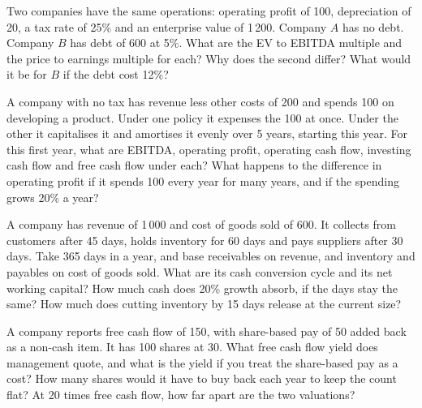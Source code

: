 \begin{question}\label{iq:iv2:valuation-and-financial-statements:13}
Two companies have the same operations: operating profit of 100, depreciation of 20, a tax rate of 25\% and an enterprise value of 1\,200. Company $A$ has no debt. Company $B$ has debt of 600 at 5\%. What are the EV to EBITDA multiple and the price to earnings multiple for each? Why does the second differ? What would it be for $B$ if the debt cost 12\%?
\end{question}

\begin{question}\label{iq:iv2:valuation-and-financial-statements:14}
A company with no tax has revenue less other costs of 200 and spends 100 on developing a product. Under one policy it expenses the 100 at once. Under the other it capitalises it and amortises it evenly over 5 years, starting this year. For this first year, what are EBITDA, operating profit, operating cash flow, investing cash flow and free cash flow under each? What happens to the difference in operating profit if it spends 100 every year for many years, and if the spending grows 20\% a year?
\end{question}

\begin{question}\label{iq:iv2:valuation-and-financial-statements:15}
A company has revenue of 1\,000 and cost of goods sold of 600. It collects from customers after 45 days, holds inventory for 60 days and pays suppliers after 30 days. Take 365 days in a year, and base receivables on revenue, and inventory and payables on cost of goods sold. What are its cash conversion cycle and its net working capital? How much cash does 20\% growth absorb, if the days stay the same? How much does cutting inventory by 15 days release at the current size?
\end{question}

\begin{question}\label{iq:iv2:valuation-and-financial-statements:16}
A company reports free cash flow of 150, with share-based pay of 50 added back as a non-cash item. It has 100 shares at 30. What free cash flow yield does management quote, and what is the yield if you treat the share-based pay as a cost? How many shares would it have to buy back each year to keep the count flat? At 20 times free cash flow, how far apart are the two valuations?
\end{question}

